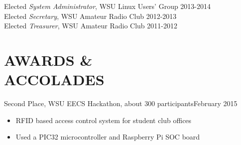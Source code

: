 \documentclass[line, margin]{res}
\begin{document}
\begin{resume}
            Elected {\it System Administrator}, WSU Linux Users' Group \hfill 2013-2014\\
            Elected {\it Secretary}, WSU Amateur Radio Club \hfill 2012-2013\\
            Elected {\it Treasurer}, WSU Amateur Radio Club \hfill 2011-2012\\

\section{AWARDS \& \\ ACCOLADES}
            Second Place, WSU EECS Hackathon, about 300 participants\hfill February 2015
        \begin{itemize} \itemsep -2pt
                \item RFID based access control system for student club offices
                \item Used a PIC32 microcontroller and Raspberry Pi SOC board
            \end{itemize}

\end{resume}
\end{document}
